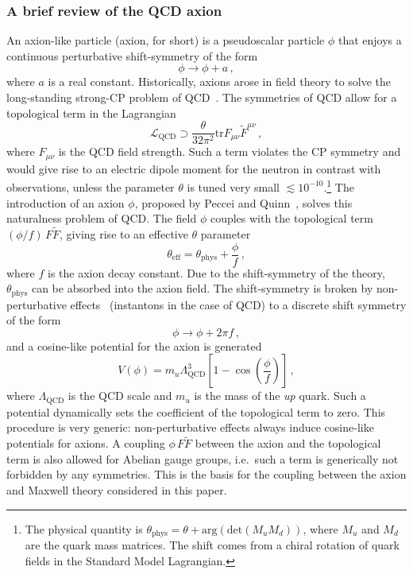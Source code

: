 \label{app:axions}
\subsubsection*{A brief review of the QCD axion}
An axion-like particle (axion, for short) is a pseudoscalar particle $\phi$ that enjoys a continuous perturbative shift-symmetry of the form
\begin{equation}
\phi \rightarrow \phi + a	\,,
\end{equation}
where $a$ is a real constant. Historically, axions arose in field theory to solve the long-standing strong-CP problem of QCD~\cite{Crewther:1979pi}. The symmetries of QCD allow for a topological term in the Lagrangian
\begin{equation}
\mathcal{L}_{\text{QCD}} \supset \frac{\theta}{32 \pi^2} \text{tr} F_{\mu \nu} \tilde{F}^{\mu \nu} \,,
\end{equation}
where $F_{\mu \nu}$ is the QCD field strength. Such a term violates the CP symmetry and would give rise to an electric dipole moment for the neutron in contrast with observations, unless the parameter $\theta$ is tuned very small $\lesssim 10^{-10}$\cite{Baker:2006ts}.\footnote{The physical quantity is $\theta_{\text{phys}} = \theta + \text{arg} \left(\text{det} \left(M_u M_d\right)\right)$, where $M_u$ and $M_d$ are the quark mass matrices. The shift comes from a chiral rotation of quark fields in the Standard Model Lagrangian.} The introduction of an axion $\phi$, proposed by Peccei and Quinn~\cite{Peccei:1977hh, Wilczek:1977pj, Weinberg:1977ma}, solves this naturalness problem of QCD. The field $\phi$ couples with the topological term $\left(\phi/f\right) \, F \tilde F$, giving rise to an effective $\theta$ parameter
\begin{equation}
\theta_{\text{eff}} = \theta_{\text{phys}} + \frac{\phi}{f}\,,
\end{equation}
where $f$ is the axion decay constant. Due to the shift-symmetry of the theory, $\theta_{\text{phys}}$ can be absorbed into the axion field. The shift-symmetry is broken by non-perturbative effects~\cite{Vafa:1984xg} (instantons in the case of QCD) to a discrete shift symmetry of the form
\begin{equation}
\phi \rightarrow \phi + 2 \pi f\,,
\end{equation}
and a cosine-like potential for the axion is generated
\begin{equation}
\label{eq:axionpotential}
V(\phi) = m_u \Lambda_{\text{QCD}}^3 \left[1 - \cos \left(\frac{\phi}{f}\right)\right]\,,
\end{equation}
where $\Lambda_{\text{QCD}}$ is the QCD scale and $m_u$ is the mass of the \textit{up} quark. Such a potential dynamically sets the coefficient of the topological term to zero. This procedure is very generic: non-perturbative effects always induce cosine-like potentials for axions. A coupling $\phi \, F \tilde F$ between the axion and the topological term is also allowed for Abelian gauge groups, i.e.~such a term is generically not forbidden by any symmetries. This is the basis for the coupling between the axion and Maxwell theory considered in this paper.


